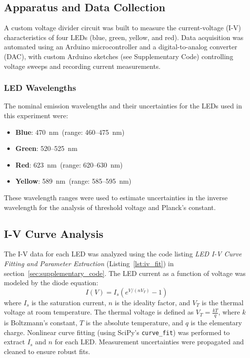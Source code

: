 \documentclass[12pt,a4paper]{article}
\begin{document}
\subsection{Apparatus and Data Collection}
A custom voltage divider circuit was built to measure the current-voltage (I-V) characteristics of four LEDs (blue, green, yellow, and red). Data acquisition was automated using an Arduino microcontroller and a digital-to-analog converter (DAC), with custom Arduino sketches (see Supplementary Code) controlling voltage sweeps and recording current measurements.

\subsubsection*{LED Wavelengths}
The nominal emission wavelengths and their uncertainties for the LEDs used in this experiment were:

\begin{itemize}
    \item \textbf{Blue}: 470~nm\ (range: 460--475~nm)
    \item \textbf{Green}: 520--525~nm
    \item \textbf{Red}: 623~nm\ (range: 620--630~nm)
    \item \textbf{Yellow}: 589~nm\ (range: 585--595~nm)
\end{itemize}

These wavelength ranges were used to estimate uncertainties in the inverse wavelength for the analysis of threshold voltage and Planck's constant.

\subsection{I-V Curve Analysis}
The I-V data for each LED was analyzed using the code listing \textit{LED I-V Curve Fitting and Parameter Extraction} (Listing~\ref{lst:iv_fit}) in section~\ref{sec:supplementary_code}. The LED current as a function of voltage was modeled by the diode equation:
\begin{equation}
I(V) = I_s \left( e^{V/(n V_T)} - 1 \right)
\label{eq:diode}
\end{equation}
where $I_s$ is the saturation current, $n$ is the ideality factor, and $V_T$ is the thermal voltage at room temperature. The thermal voltage is defined as $V_T = \frac{kT}{q}$, where $k$ is Boltzmann's constant, $T$ is the absolute temperature, and $q$ is the elementary charge. Nonlinear curve fitting (using SciPy’s \texttt{curve\_fit}) was performed to extract $I_s$ and $n$ for each LED. Measurement uncertainties were propagated and cleaned to ensure robust fits.
\end{document}
